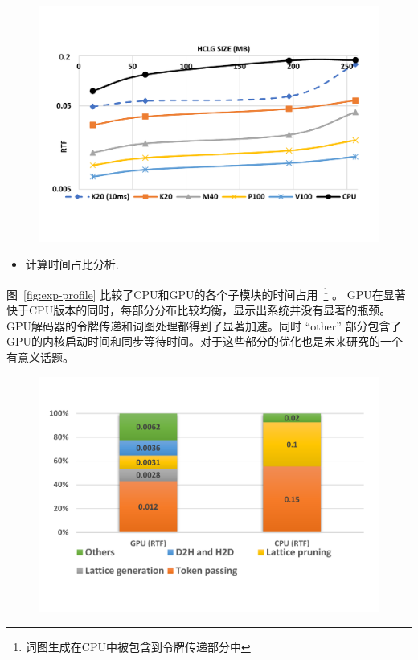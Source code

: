 \begin{figure}[!htp]
  \centering
    \captionstyle{\centering}
    \includegraphics[width=\textwidth]{figure/gpu_analysis.pdf}
\end{figure}


\begin{itemize} 
   \item 计算时间占比分析.
   \vspace{-0.25em}
 \end{itemize} 
  图~\ref{fig:exp-profile} 比较了CPU和GPU的各个子模块的时间占用~\footnote{词图生成在CPU中被包含到令牌传递部分中} 。
  GPU在显著快于CPU版本的同时，每部分分布比较均衡，显示出系统并没有显著的瓶颈。GPU解码器的令牌传递和词图处理都得到了显著加速。同时 ``other'' 部分包含了GPU的内核启动时间和同步等待时间。对于这些部分的优化也是未来研究的一个有意义话题。


\begin{figure}[!htp]
  \centering
    \captionstyle{\centering}
    \includegraphics[width=\textwidth]{figure/gpu_profile.pdf}
\end{figure}

